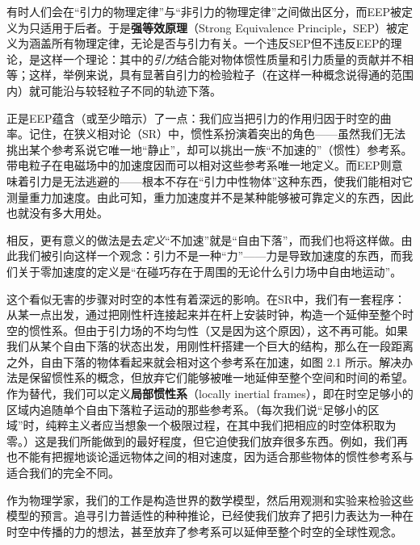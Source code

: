 有时人们会在“引力的物理定律”与“非引力的物理定律”之间做出区分，而EEP被定义为只适用于后者。于是\textbf{强等效原理}（Strong Equivalence Principle，SEP）被定义为涵盖所有物理定律，无论是否与引力有关。一个违反SEP但不违反EEP的理论，是这样一个理论：其中的\emph{引力}结合能对物体惯性质量和引力质量的贡献并不相等；这样，举例来说，具有显著自引力的检验粒子（在这样一种概念说得通的范围内）就可能沿与较轻粒子不同的轨迹下落。

正是EEP蕴含（或至少暗示）了一点：我们应当把引力的作用归因于时空的曲率。记住，在狭义相对论（SR）中，惯性系扮演着突出的角色——虽然我们无法挑出某个参考系说它唯一地“静止”，却可以挑出一族“不加速的”（惯性）参考系。带电粒子在电磁场中的加速度因而可以相对这些参考系唯一地定义。而EEP则意味着引力是无法逃避的——根本不存在“引力中性物体”这种东西，使我们能相对它测量重力加速度。由此可知，重力加速度并不是某种能够被可靠定义的东西，因此也就没有多大用处。

相反，更有意义的做法是去\emph{定义}“不加速”就是“自由下落”，而我们也将这样做。由此我们被引向这样一个观念：引力不是一种“力”——力是导致加速度的东西，而我们关于零加速度的定义是“在碰巧存在于周围的无论什么引力场中自由地运动”。

这个看似无害的步骤对时空的本性有着深远的影响。在SR中，我们有一套程序：从某一点出发，通过把刚性杆连接起来并在杆上安装时钟，构造一个延伸至整个时空的惯性系。但由于引力场的不均匀性（又是因为这个原因），这不再可能。如果我们从某个自由下落的状态出发，用刚性杆搭建一个巨大的结构，那么在一段距离之外，自由下落的物体看起来就会相对这个参考系在加速，如图 2.1 所示。解决办法是保留惯性系的概念，但放弃它们能够被唯一地延伸至整个空间和时间的希望。作为替代，我们可以定义\textbf{局部惯性系}（locally inertial frames），即在时空足够小的区域内追随单个自由下落粒子运动的那些参考系。（每次我们说“足够小的区域”时，纯粹主义者应当想象一个极限过程，在其中我们把相应的时空体积取为零。）这是我们所能做到的最好程度，但它迫使我们放弃很多东西。例如，我们再也不能有把握地谈论遥远物体之间的相对速度，因为适合那些物体的惯性参考系与适合我们的完全不同。

作为物理学家，我们的工作是构造世界的数学模型，然后用观测和实验来检验这些模型的预言。追寻引力普适性的种种推论，已经使我们放弃了把引力表达为一种在时空中传播的力的想法，甚至放弃了参考系可以延伸至整个时空的全球性观念。



